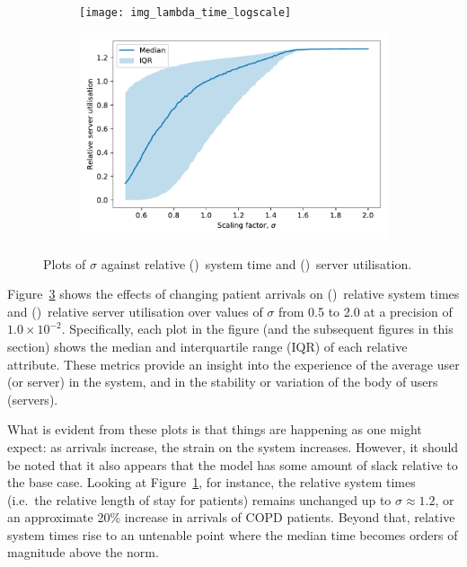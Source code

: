 \documentclass[11pt]{article}
\newlength{\imgwidth}
\begin{document}
\begin{figure}
    \centering
    \begin{subfigure}{.5\imgwidth}
        \texttt{[image: img\_lambda\_time\_logscale]}
        \caption{}\label{fig:lambda_time}
    \end{subfigure}\hfill%
    \begin{subfigure}{.5\imgwidth}
        \includegraphics[width=\linewidth]{img_lambda_util}
        \caption{}\label{fig:lambda_util}
    \end{subfigure}
    \caption{%
        Plots of \(\sigma\) against relative ()~system
        time and ()~server utilisation.
    }\label{fig:lambda}
\end{figure}

Figure~\ref{fig:lambda} shows the effects of changing patient arrivals on
()~relative system times and
()~relative server utilisation over values of \(\sigma\)
from 0.5 to 2.0 at a precision of \(1.0 \times 10^{-2}\). Specifically, each
plot in the figure (and the subsequent figures in this section) shows the median
and interquartile range (IQR) of each relative attribute. These metrics provide
an insight into the experience of the average user (or server) in the system,
and in the stability or variation of the body of users (servers).

What is evident from these plots is that things are happening as one might
expect: as arrivals increase, the strain on the system increases. However, it
should be noted that it also appears that the model has some amount of slack
relative to the base case. Looking at Figure~\ref{fig:lambda_time}, for
instance, the relative system times (i.e.\ the relative length of stay for
patients) remains unchanged up to \(\sigma \approx 1.2\), or an approximate 20\%
increase in arrivals of COPD patients. Beyond that, relative system times rise
to an untenable point where the median time becomes orders of magnitude above
the norm.
\end{document}
